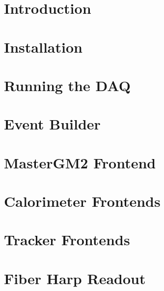 




%


\tableofcontents

\newpage

\section{Introduction}

\section{Installation}



\section{Running the DAQ}



\section{Event Builder}



\section{MasterGM2 Frontend}



\section{Calorimeter Frontends}



\section{Tracker Frontends}



\section{Fiber Harp Readout}

